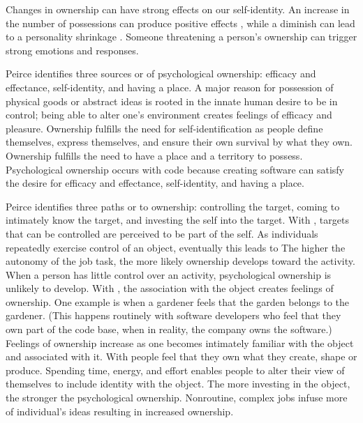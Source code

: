 Changes in ownership can have strong effects on our self-identity. An increase in the number of possessions can produce positive effects \cite{Formanek1994}, while a diminish can lead to a personality shrinkage \cite{James1890}. Someone threatening a person's ownership can trigger strong emotions and responses.


Peirce \cite{Pierce2001} identifies three sources or  of psychological ownership: efficacy and effectance, self-identity, and having a place. A major reason for possession of physical goods or abstract ideas is rooted in the innate human desire to be in control; being able to alter one's environment creates feelings of efficacy and pleasure. Ownership fulfills the need for self-identification as people define themselves, express themselves, and ensure their own survival by what they own. Ownership fulfills the need to have a place and a territory to possess.  Psychological ownership occurs with code because creating software can satisfy the desire for efficacy and effectance, self-identity, and having a place.


Peirce identifies three paths or  to ownership: controlling the target, coming to intimately know the target, and investing the self into the target. With , targets that can be controlled are perceived to be part of the self.  As  individuals repeatedly exercise control of an object, eventually this leads to  The higher the autonomy of the job task, the more likely ownership develops toward the activity. When a person has little control over an activity, psychological ownership is unlikely to develop. With , the association with the object creates feelings of ownership. One example is when a gardener feels that the garden belongs to the gardener. (This happens routinely with software developers who feel that they own part of the code base, when in reality, the company owns the software.) Feelings of ownership increase as one becomes intimately familiar with the object and associated with it. With  people feel that they own what they create, shape or produce. Spending time, energy, and effort enables people to alter their view of themselves to include identity with the object. The more investing in the object, the stronger the psychological ownership. Nonroutine, complex jobs infuse more of individual's ideas resulting in increased ownership.


